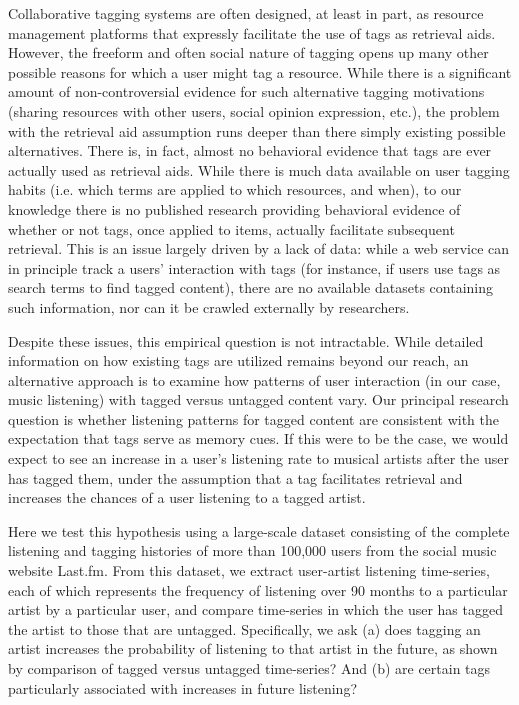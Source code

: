 \documentclass[preprint]{sig-alternate-2013}
\begin{document}
Collaborative tagging systems are often designed, at least in part, as resource management platforms that expressly facilitate the use of tags as retrieval aids.  However, the freeform and often social nature of tagging opens up many other possible reasons for which a user might tag a resource. While there is a significant amount of non-controversial evidence for such alternative tagging motivations (sharing resources with other users, social opinion expression, etc.), the problem with the retrieval aid assumption runs deeper than there simply existing possible alternatives. There is, in fact, almost no behavioral evidence that tags are ever actually used as retrieval aids. While there is much data available on user tagging habits (i.e. which terms are applied to which resources, and when), to our knowledge there is no published research providing behavioral evidence of whether or not tags, once applied to items, actually facilitate subsequent retrieval. This is an issue largely driven by a lack of data: while a web service can in principle track a users' interaction with tags (for instance, if users use tags as search terms to find tagged content), there are no available datasets containing such information, nor can it be crawled externally by researchers.

Despite these issues, this empirical question is not intractable. While detailed information on how existing tags are utilized remains beyond our reach, an alternative approach is to examine how patterns of user interaction (in our case, music listening) with tagged versus untagged content vary. Our principal research question is whether listening patterns for tagged content are consistent with the expectation that tags serve as memory cues. If this were to be the case, we would expect to see an increase in a user's listening rate to musical artists after the user has tagged them, under the assumption that a tag facilitates retrieval and increases the chances of a user listening to a tagged artist. 

Here we test this hypothesis using a large-scale dataset \cite{Lorince2014} consisting of the complete listening and tagging histories of more than 100,000 users from the social music website Last.fm. From this dataset, we extract user-artist listening time-series, each of which represents the frequency of listening over 90 months to a particular artist by a particular user, and compare time-series in which the user has tagged the artist to those that are untagged. Specifically, we ask (a) does tagging an artist increases the probability of listening to that artist in the future, as shown by comparison of tagged versus untagged time-series? And (b) are certain tags particularly associated with increases in future listening?
\end{document}
